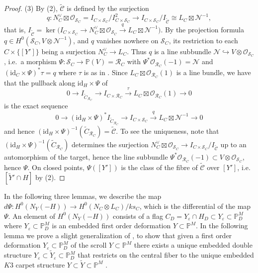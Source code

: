 \documentclass[11pt,reqno]{amsart}
\theoremstyle{plain}
\theoremstyle{definition}
\newcommand{\PP}{\mathbb{P}}
\newcommand{\OO}{\mathcal{O}}
\newcommand{\id}{\mathrm{id}}
\newcommand{\Yt}{\widetilde{Y}}
\newcommand{\Ct}{\widetilde{C}}
\newcommand{\SC}{\mathcal{S}_C}
\newcommand{\RC}{\mathcal{R}_C}
\newcommand{\cCt}{\widetilde{\mathcal{C}}}
\newcommand{\cN}{\mathcal{N}}
\begin{document}
\begin{proof}
(3) By (2), $\cCt$ is defined by the surjection
\[
q\colon N_C^{\vee}\boxtimes\OO_{\SC}=I_{C\times\SC}/I_{C\times\SC}^2\longrightarrow I_{C\times\SC}/I_{\cCt}\cong L_C\boxtimes\cN^{-1},
\]
that is, $I_{\cCt}=\ker\big(I_{C\times\SC}\to N_C^{\vee}\boxtimes\OO_{\SC}\xrightarrow{\ q\ }L_C\boxtimes\cN^{-1}\big)$.
By the projection formula $q\in H^0(\SC,V\otimes\cN^{-1})$, and $q$ vanishes nowhere on $\SC$, its restriction to each $C\times\{[Y']\}$ being a surjection $N_C^{\vee}\to L_C$. Thus $q$ is a line subbundle $\cN\hookrightarrow V\otimes\OO_{\SC}$, i.e.\ a morphism $\Psi\colon\SC\to\PP(V)=\RC$ with $\Psi^*\OO_{\RC}(-1)=\cN$ and $(\id_C\times\Psi)^*\tau=q$ where $\tau$ is as in . Since $L_C\boxtimes\OO_{\RC}(1)$ is a line bundle, we have that the pullback along $\id_H\times\Psi$  of $$0\to I_{\Ct_{\RC}}\to I_{C\times\RC}\xrightarrow{\tau} L_C\boxtimes\OO_{\RC}(1)\to0$$ is the exact sequence $$0\to(\id_H\times\Psi)^*I_{\Ct_{\RC}}\to I_{C\times\SC}\xrightarrow{q}L_C\boxtimes\cN^{-1}\to0$$ and hence $(\id_H\times\Psi)^{-1}(\Ct_{\RC})=\cCt$. To see the uniqueness, note that $(\id_H\times\Psi)^{-1}(\Ct_{\RC})$ determines the surjection $N_C^{\vee}\boxtimes\OO_{\SC}\to I_{C\times\SC}/I_{\cCt}$ up to an automorphism of the target, hence the line subbundle $\Psi^*\OO_{\RC}(-1)\subset V\otimes\OO_{\SC}$, hence $\Psi$. On closed points, $\Psi([Y'])$ is the class of the fibre of $\cCt$ over $[Y']$, i.e.\ $[\Yt'\cap H]$ by (2).
\end{proof}





In the following three lemmas, we describe the map $d\Psi: H^0(N_Y(-H)) \to H^0(N_C \otimes L_C)/ks_C$, which is the differential of the map $\Psi$. An element of $H^0(N_Y(-H))$ consists of a flag $C_D = Y_{\varepsilon} \cap H_D \subset Y_{\varepsilon} \subset \mathbb{P}_D^M$ where $Y_{\varepsilon} \subset \mathbb{P}_D^M$ is an embedded first order deformation $Y \subset \mathbb{P}^M$. In the following lemma we prove a slight generalization of \cite[Prop.~3.7]{GP97}, to show that given a first order deformation $Y_{\varepsilon} \subset \mathbb{P}_D^M$ of the scroll $Y \subset \mathbb{P}^M$ there exists a unique embedded double structure $Y_{\varepsilon} \subset \widetilde Y_{\varepsilon} \subset \mathbb{P}_D^M$  that restricts on the central fiber to the unique embedded $K3$ carpet structure $Y \subset \widetilde Y \subset \mathbb{P}^M$ .
\end{document}
